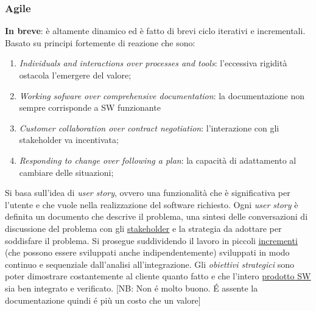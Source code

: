 			\subsubsection{Agile} 
			\textbf{In breve}: è altamente dinamico ed è fatto di brevi ciclo iterativi e incrementali. \\
			Basato su principi fortemente di reazione che sono:
				\begin{enumerate}
			 		\item \textit{Individuals and interactions over processes and tools}: l’eccessiva rigidità ostacola l’emergere del valore;
			 		\item \textit{Working sofware over comprehensive documentation}: la documentazione non sempre corrisponde a SW funzionante
			 		\item \textit{Customer collaboration over contract negotiation}: l’interazione con gli stakeholder va incentivata;
			 		\item \textit{Responding to change over following a plan}: la capacità di adattamento al cambiare delle situazioni;
			 	\end{enumerate}
		 	Si basa sull'idea di \textit{user story}, ovvero una funzionalità che è significativa per l'utente e che vuole nella realizzazione del software richiesto. Ogni \textit{user story} è definita un documento che descrive il problema, una sintesi delle conversazioni di discussione del problema con gli \underline{\hyperref[stakeholder]{stakeholder}} e la strategia da adottare per soddisfare il problema. Si prosegue suddividendo il lavoro in piccoli  \underline{\hyperref[incremento]{incrementi}} (che possono essere sviluppati anche indipendentemente) sviluppati in modo continuo e sequenziale dall'analisi all'integrazione. Gli \textit{obiettivi strategici} sono poter dimostrare costantemente al cliente quanto fatto e che l'intero  \underline{\hyperref[prodotto]{prodotto SW}} sia ben integrato e verificato.
		 	[NB: Non é molto buono. É assente la documentazione quindi é più un costo che un valore]

